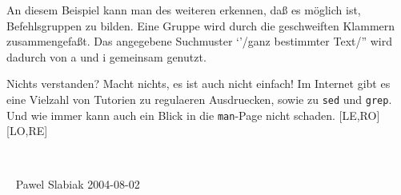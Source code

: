 \documentclass[12pt,]{article}
\begin{document}
An diesem Beispiel kann man des weiteren erkennen, daß es möglich ist,
Befehlsgruppen zu bilden. Eine Gruppe wird durch die geschweiften
Klammern zusammengefaßt. Das angegebene Suchmuster `'/ganz bestimmter
Text/'' wird dadurch von a und i gemeinsam genutzt.

Nichts verstanden? Macht nichts, es ist auch nicht einfach! Im Internet
gibt es eine Vielzahl von Tutorien zu regulaeren Ausdruecken, sowie zu
\texttt{sed} und \texttt{grep}. Und wie immer kann auch ein Blick in die
\texttt{man}-Page nicht schaden. {[}LE,RO{]} {[}LO,RE{]}

~

~ Pawel Slabiak 2004-08-02

\hypertarget{refs}{}
\end{document}
